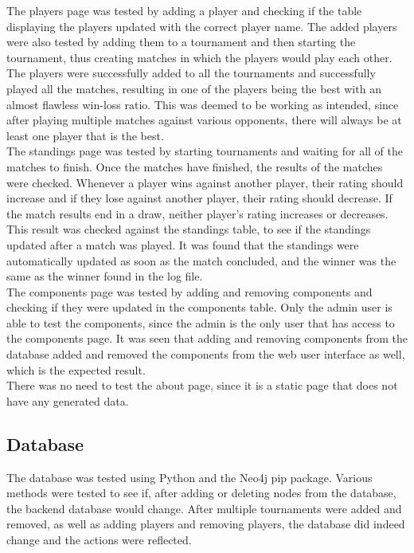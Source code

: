 \documentclass[a4paper, 11pt]{report}
\begin{document}
The players page was tested by adding a player and checking if the table displaying
the players updated with the correct player name. The added players were also tested
by adding them to a tournament and then starting the tournament, thus creating
matches in which the players would play each other. The players were successfully
added to all the tournaments and successfully played all the matches, resulting
in one of the players being the best with an almost flawless win-loss ratio.
This was deemed to be working as intended, since after playing multiple matches
against various opponents, there will always be at least one player that is the
best. \\

The standings page was tested by starting tournaments and waiting for all of
the matches to finish. Once the matches have finished, the results of the matches
were checked. Whenever a player wins against another player, their rating should
increase and if they lose against another player, their rating should decrease.
If the match results end in a draw, neither player's rating increases or decreases.
This result was checked against the standings table, to see if the standings
updated after a match was played. It was found that the standings were automatically
updated as soon as the match concluded, and the winner was the same as the winner
found in the log file. \\

The components page was tested by adding and removing components and checking if
they were updated in the components table. Only the admin user is able to test
the components, since the admin is the only user that has access to the components
page. It was seen that adding and removing components from the database added
and removed the components from the web user interface as well, which is the
expected result. \\

There was no need to test the about page, since it is a static page that does
not have any generated data.

\subsection{Database}

The database was tested using Python and the Neo4j pip package. Various methods
were tested to see if, after adding or deleting nodes from the database, the
backend database would change. After multiple tournaments were added and removed,
as well as adding players and removing players, the database did indeed change
and the actions were reflected. \\
\end{document}
